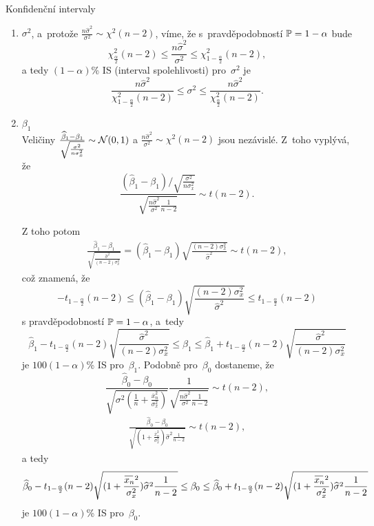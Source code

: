 Konfidenční intervaly\\
\begin{enumerate}
\item $\sigma^2$, a~protože $\frac{n\widehat{\sigma}^2}{\sigma^2}\sim {\chi}^2(n-2)$, víme, že s~pravděpodobností $\mathbb{P}=1-\alpha$ bude
$${\chi}^2_{\frac{\alpha}{2}}(n-2) \leq \frac{n\widehat{\sigma}^2}{\sigma^2} \leq {\chi}^2_{1-\frac{\alpha}{2}}(n-2),$$
a tedy $(1-\alpha)$\% IS (interval spolehlivosti) pro~$\sigma^2$ je
$$\frac{n\widehat{\sigma}^2}{{\chi}^2_{1-\frac{\alpha}{2}}(n-2)} \leq \sigma^2 \leq \frac{n\widehat{\sigma}^2}{{\chi}^2_{\frac{\alpha}{2}}(n-2)}.$$
\item $\beta_1$\\
Veličiny 
$\frac{\widehat{\beta}_1-\beta_1}{\sqrt{\frac{\sigma^2}{n\sigma_x^2}}}\sim \mathcal{N}(0,1) $
a
$\frac{n\widehat{\sigma}^2}{\sigma^2} \sim {\chi}^2(n-2) $
jsou nezávislé. Z~toho vyplývá, že 
$$
 \frac{(\widehat{\beta}_1-\beta_1)\Big/\sqrt{\frac{\sigma^2}{n\sigma_x^2}}}{\sqrt{\frac{n\widehat{\sigma}^2}{\sigma^2}\frac{1}{n-2}}} \sim t(n-2).$$

Z toho potom
\begin{align}
 \frac{\widehat{\beta}_1-\beta_1}{\sqrt{\frac{\widehat{\sigma}^2}{(n-2)\sigma_x^2}}}=(\widehat{\beta}_1-\beta_1)\sqrt{\frac{(n-2)\sigma_x^2}{\widehat{\sigma}^2}}\sim t(n-2), \label{eq1}
\end{align}
což znamená, že
$$-t_{1-\frac{\alpha}{2}}(n-2) \leq (\widehat{\beta}_1-\beta_1)\sqrt{\frac{(n-2)\sigma_x^2}{\widehat{\sigma}^2}}   \leq t_{1-\frac{\alpha}{2}}(n-2)$$
s pravděpodobností $\mathbb{P}=1-\alpha$, a~tedy
$$\widehat{\beta}_1-t_{1-\frac{\alpha}{2}}(n-2)\sqrt{\frac{\widehat{\sigma}^2}{(n-2)\sigma_x^2}}  \leq \beta_1 \leq \widehat{\beta}_1+t_{1-\frac{\alpha}{2}}(n-2)\sqrt{\frac{\widehat{\sigma}^2}{(n-2)\sigma_x^2}}$$
je $100(1-\alpha)$\% IS pro~$\beta_1$.
Podobně pro~$\beta_0$ dostaneme, že 
$$ \frac{\widehat{\beta}_0-\beta_0}{\sqrt{\sigma^2(\frac{1}{n}+\frac{\overline{x}_n^2}{\sigma_x^2})}} \frac{1}{\sqrt{\frac{n\widehat{\sigma}^2}{\sigma^2}\frac{1}{n-2}}} \sim t(n-2), $$
\begin{align}
\frac{\widehat{\beta}_0-\beta_0}{\sqrt{(1+\frac{\overline{x}_n^2}{\sigma_x^2})\widehat{\sigma}^2\frac{1}{n-2}}} \sim t(n-2), \label{eq2}
\end{align}
a tedy
$$\widehat{\beta}_0-t_{1-\frac{\alpha}{2}}(n-2){\sqrt{(1+\frac{\oxnn^2}{\sigma_x^2})\widehat{\sigma}^2\frac{1}{n-2}}} \leq \beta_0 \leq \widehat{\beta}_0+t_{1-\frac{\alpha}{2}}(n-2){\sqrt{(1+\frac{\oxnn^2}{\sigma_x^2})\widehat{\sigma}^2\frac{1}{n-2}}}$$
je $100(1-\alpha)$\% IS pro~$\beta_0$.
\end{enumerate}

